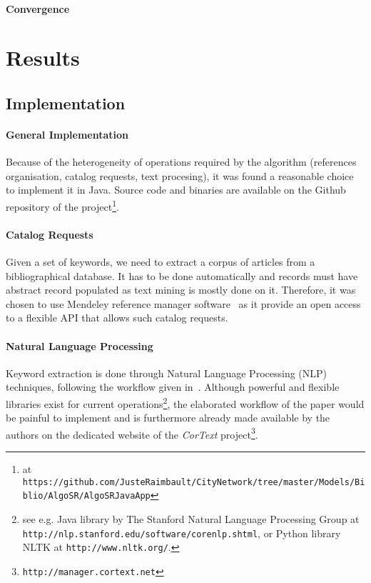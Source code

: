 \paragraph{Convergence}



\section{Results}

\subsection{Implementation}

\paragraph{General Implementation}
Because of the heterogeneity of operations required by the algorithm (references organisation, catalog requests, text procesing), it was found a reasonable choice to implement it in Java. Source code and binaries are available on the Github repository of the project\footnote{at \texttt{https://github.com/JusteRaimbault/CityNetwork/tree/master/Models/Biblio/AlgoSR/AlgoSRJavaApp}}.

\paragraph{Catalog Requests}
Given a set of keywords, we need to extract a corpus of articles from a bibliographical database. It has to be done automatically and records must have abstract record populated as text mining is mostly done on it. Therefore, it was chosen to use Mendeley reference manager software~\cite{mendeley} as it provide an open access to a flexible API that allows such catalog requests.


\paragraph{Natural Language Processing}
Keyword extraction is done through Natural Language Processing (NLP) techniques, following the workflow given in~\cite{chavalarias2013phylomemetic}. Although powerful and flexible libraries exist for current operations\footnote{see e.g. Java library by The Stanford Natural Language Processing Group at \texttt{http://nlp.stanford.edu/software/corenlp.shtml}, or Python library NLTK at \texttt{http://www.nltk.org/}.}, the elaborated workflow of the paper would be painful to implement and is furthermore already made available by the authors on the dedicated website of the \emph{CorText} project\footnote{\texttt{http://manager.cortext.net}}.


